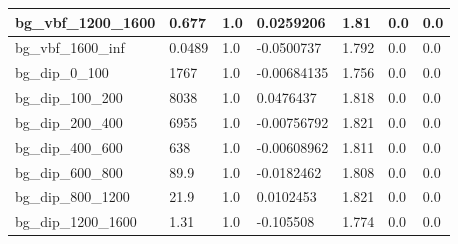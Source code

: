 \documentclass[a4paper, 10pt]{article}
\begin{document}
\begin{table}[H]
\begin{center}
\begin{tabular}{|m{23.0mm}|m{23.0mm}|m{18.0mm}|m{19.0mm}|m{19.0mm}|m{19.0mm}|m{19.0mm}|}
      \hline
      {\cellcolor{white}         bg\_vbf\_1200\_1600}& {\cellcolor{white}         0.677}& {\cellcolor{white}         1.0}& {\cellcolor{white}         0.0259206}& {\cellcolor{white}         1.81}& {\cellcolor{green}         0.0}& {\cellcolor{green}         0.0}\\
      \hline
      {\cellcolor{white}         bg\_vbf\_1600\_inf}& {\cellcolor{white}         0.0489}& {\cellcolor{white}         1.0}& {\cellcolor{white}         -0.0500737}& {\cellcolor{white}         1.792}& {\cellcolor{green}         0.0}& {\cellcolor{green}         0.0}\\
      \hline
      {\cellcolor{white}         bg\_dip\_0\_100}& {\cellcolor{white}         1767}& {\cellcolor{white}         1.0}& {\cellcolor{white}         -0.00684135}& {\cellcolor{white}         1.756}& {\cellcolor{green}         0.0}& {\cellcolor{green}         0.0}\\
      \hline
      {\cellcolor{white}         bg\_dip\_100\_200}& {\cellcolor{white}         8038}& {\cellcolor{white}         1.0}& {\cellcolor{white}         0.0476437}& {\cellcolor{white}         1.818}& {\cellcolor{green}         0.0}& {\cellcolor{green}         0.0}\\
      \hline
      {\cellcolor{white}         bg\_dip\_200\_400}& {\cellcolor{white}         6955}& {\cellcolor{white}         1.0}& {\cellcolor{white}         -0.00756792}& {\cellcolor{white}         1.821}& {\cellcolor{green}         0.0}& {\cellcolor{green}         0.0}\\
      \hline
      {\cellcolor{white}         bg\_dip\_400\_600}& {\cellcolor{white}         638}& {\cellcolor{white}         1.0}& {\cellcolor{white}         -0.00608962}& {\cellcolor{white}         1.811}& {\cellcolor{green}         0.0}& {\cellcolor{green}         0.0}\\
      \hline
      {\cellcolor{white}         bg\_dip\_600\_800}& {\cellcolor{white}         89.9}& {\cellcolor{white}         1.0}& {\cellcolor{white}         -0.0182462}& {\cellcolor{white}         1.808}& {\cellcolor{green}         0.0}& {\cellcolor{green}         0.0}\\
      \hline
      {\cellcolor{white}         bg\_dip\_800\_1200}& {\cellcolor{white}         21.9}& {\cellcolor{white}         1.0}& {\cellcolor{white}         0.0102453}& {\cellcolor{white}         1.821}& {\cellcolor{green}         0.0}& {\cellcolor{green}         0.0}\\
      \hline
      {\cellcolor{white}         bg\_dip\_1200\_1600}& {\cellcolor{white}         1.31}& {\cellcolor{white}         1.0}& {\cellcolor{white}         -0.105508}& {\cellcolor{white}         1.774}& {\cellcolor{green}         0.0}& {\cellcolor{green}         0.0}\\

\end{tabular}
\end{center}
\end{table}
\end{document}
